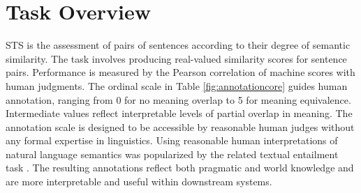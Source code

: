 \documentclass[11pt,a4paper]{article}
\begin{document}
\section{Task Overview}
 
STS is the assessment of pairs of sentences according
to their degree of semantic similarity. The task involves producing real-valued similarity scores for sentence pairs. Performance is measured by the Pearson correlation of machine scores with human judgments. 
 The ordinal scale in Table \ref{fig:annotationcore} guides human annotation, ranging from 0 for no meaning overlap to 5 for meaning equivalence. Intermediate values reflect interpretable levels of partial overlap in meaning. The annotation scale is designed to be accessible by reasonable human judges without any formal expertise in linguistics. Using reasonable human interpretations of natural language semantics was popularized by the related textual entailment task \cite{dagan2009}. The resulting annotations reflect both pragmatic and world knowledge and are more interpretable and useful within downstream systems.
 
\end{document}
